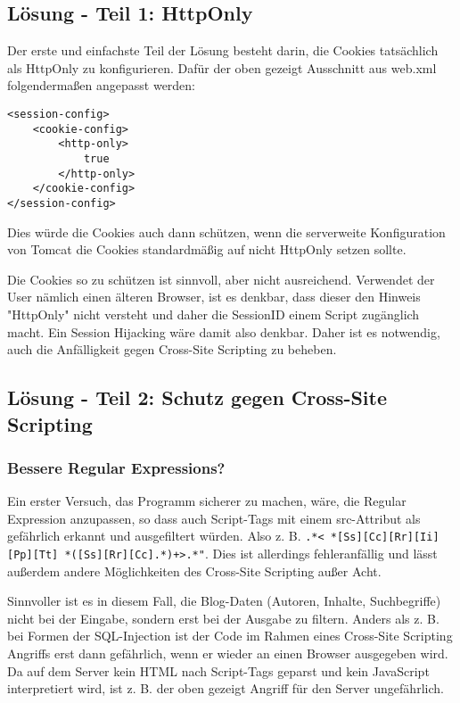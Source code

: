 \subsection{Lösung - Teil 1: HttpOnly}

Der erste und einfachste Teil der Lösung besteht darin, die Cookies tatsächlich als HttpOnly zu konfigurieren. Dafür der oben gezeigt Ausschnitt aus web.xml folgendermaßen angepasst werden:

\begin{lstlisting}
<session-config>
	<cookie-config>
		<http-only>
			true
		</http-only>
	</cookie-config>
</session-config>
\end{lstlisting}

Dies würde die Cookies auch dann schützen, wenn die serverweite Konfiguration von Tomcat die Cookies standardmäßig auf nicht HttpOnly setzen sollte.

Die Cookies so zu schützen ist sinnvoll, aber nicht ausreichend. Verwendet der User nämlich einen älteren Browser, ist es denkbar, dass dieser den Hinweis "HttpOnly" nicht versteht und daher die SessionID einem Script zugänglich macht. Ein Session Hijacking wäre damit also denkbar. Daher ist es notwendig, auch die Anfälligkeit gegen Cross-Site Scripting zu beheben.

\subsection{Lösung - Teil 2: Schutz gegen Cross-Site Scripting}

\subsubsection{Bessere Regular Expressions?}

Ein erster Versuch, das Programm sicherer zu machen, wäre, die Regular Expression anzupassen, so dass auch Script-Tags mit einem src-Attribut als gefährlich erkannt und ausgefiltert würden. Also z. B. \lstinline$.*< *[Ss][Cc][Rr][Ii][Pp][Tt] *([Ss][Rr][Cc].*)+>.*"$. Dies ist allerdings fehleranfällig und lässt außerdem andere Möglichkeiten des Cross-Site Scripting außer Acht.

Sinnvoller ist es in diesem Fall, die Blog-Daten (Autoren, Inhalte, Suchbegriffe) nicht bei der Eingabe, sondern erst bei der Ausgabe zu filtern. Anders als z. B. bei Formen der SQL-Injection ist der Code im Rahmen eines Cross-Site Scripting Angriffs erst dann gefährlich, wenn er wieder an einen Browser ausgegeben wird. Da auf dem Server kein HTML nach Script-Tags geparst und kein JavaScript interpretiert wird, ist z. B. der oben gezeigt Angriff für den Server ungefährlich.


